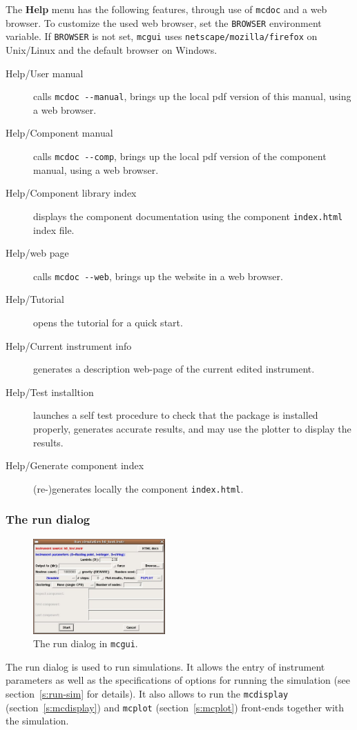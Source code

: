 \noindent The {\bf Help} menu has the following features, through use of
\verb+mcdoc+ and a web browser. To customize the used web browser, set
the \verb+BROWSER+ environment variable. If \verb+BROWSER+ is not set,
\verb+mcgui+ uses \verb+netscape/mozilla/firefox+ on Unix/Linux and the default browser on
Windows.
\begin{description}
\item[Help/\MCS User manual] calls \verb+mcdoc --manual+, brings up the local
  pdf version of this manual, using a web browser.
\item[Help/\MCS Component manual] calls \verb+mcdoc --comp+, brings up the local
  pdf version of the component manual, using a web browser.
\item[Help/Component library index] displays the component documentation using
  the component \verb+index.html+ index file.
\item[Help/\MCS web page] calls \verb+mcdoc --web+, brings up the \MCS
  website in a web browser.
\item[Help/Tutorial] opens the \MCS tutorial for a quick start.
\item[Help/Current instrument info] generates a description web-page of the current edited instrument.
\item[Help/Test \MCS installtion] launches a self test procedure to check that the \MCS package is installed properly, generates accurate results, and may use the plotter to display the results.
\item[Help/Generate component index] (re-)generates locally the component \verb+index.html+.
\end{description}


\subsubsection{The run dialog}

\begin{figure}[htb!]
  \begin{center}
    \includegraphics[width=0.45\textwidth]{figures/mcgui-run.eps}
  \end{center}
\caption{The run dialog in \texttt{mcgui}.}
\label{fig:mcgui-run}
\end{figure}
%
The run dialog is used to run simulations. It allows the entry of
instrument parameters as well as the specifications of options for
running the simulation (see section~\ref{s:run-sim} for details). It
also allows to run the \verb+mcdisplay+ (section~\ref{s:mcdisplay}) and
\verb+mcplot+ (section~\ref{s:mcplot}) front-ends together with the
simulation.

